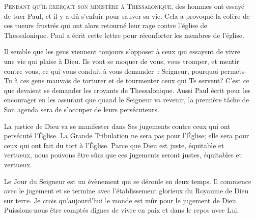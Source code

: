 


\lettrine{P}{endant qu'il exerçait son ministère à Thessalonique,}
 des hommes ont essayé de tuer Paul, et il y a dû s'enfuir pour sauver sa vie.
 Cela a provoqué la colère de ces tueurs frustrés qui ont alors retourné
 leur rage contre l'église de Thessalonique. Paul a écrit cette lettre
 pour réconforter les membres de l'église.

Il semble que les gens viennent toujours s'opposer à ceux qui essayent
 de vivre une vie qui plaise à Dieu. Ils vont se moquer de vous, vous tromper,
 et mentir contre vous, ce qui vous conduit à  vous demander~: 
 \og Seigneur, pourquoi permets-Tu  à ces gens mauvais de torturer
 et de tourmenter ceux qui Te servent? \fg{} 
 C'est ce que devaient se demander les croyants de Thessalonique.
 Aussi Paul écrit pour les encourager en les assurant que quand le Seigneur
 va revenir, la première tâche de Son agenda sera de s'occuper
 de leurs persécuteurs.


La justice de Dieu va se manifester dans Ses jugements contre ceux
 qui ont persécuté l'Église. La Grande Tribulation ne sera pas pour l'Église;
 elle sera pour ceux qui ont fait du tort à l'Église.
 Parce que Dieu est juste, équitable et vertueux, nous pouvons être sûrs
 que ces jugements seront justes, équitables et vertueux.

Le Jour du Seigneur est un évènement qui se déroule en
 deux temps. Il commence avec le jugement et se termine avec l'établissement
 glorieux du Royaume de Dieu sur terre. Je crois qu'aujourd'hui le monde
 est mûr pour le jugement de Dieu. Puissions-nous être comptés dignes de vivre
 en paix et dans le repos avec Lui.

\dvrule




